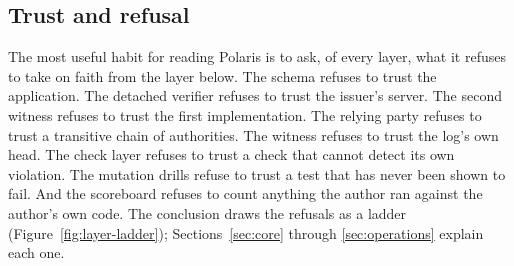 \subsection{Trust and refusal}

The most useful habit for reading Polaris is to ask, of every layer, what it refuses to take on
faith from the layer below. The schema refuses to trust the application. The detached verifier
refuses to trust the issuer's server. The second witness refuses to trust the first implementation.
The relying party refuses to trust a transitive chain of authorities. The witness refuses to trust
the log's own head. The check layer refuses to trust a check that cannot detect its own violation.
The mutation drills refuse to trust a test that has never been shown to fail. And the scoreboard
refuses to count anything the author ran against the author's own code.
The conclusion draws the refusals as a ladder (Figure~\ref{fig:layer-ladder}); Sections~\ref{sec:core} through
\ref{sec:operations} explain each one.
